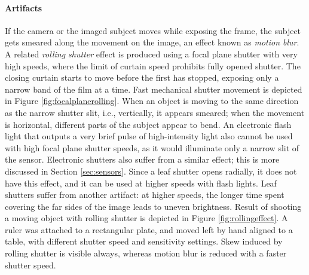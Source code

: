 \paragraph{Artifacts}
If the camera or the imaged subject moves while exposing the frame, the subject gets smeared along the movement on the image, an effect known as \emph{motion blur}.
A related \emph{rolling shutter} effect is produced using a focal plane shutter with very high speeds, where the limit of curtain speed prohibits fully opened shutter.
The closing curtain starts to move before the first has stopped, exposing only a narrow band of the film at a time.
Fast mechanical shutter movement is depicted in Figure \ref{fig:focalplanerolling}.
When an object is moving to the same direction as the narrow shutter slit, i.e., vertically, it appears smeared;
when the movement is horizontal, different parts of the subject appear to bend.
An electronic flash light that outputs a very brief pulse of high-intensity light also cannot be used with high focal plane shutter speeds, as it would illuminate only a narrow slit of the sensor.
Electronic shutters also suffer from a similar effect; this is more discussed in Section \ref{sec:sensors}.
Since a leaf shutter opens radially, it does not have this effect, and it can be used at higher speeds with flash lights.
Leaf shutters suffer from another artifact:
at higher speeds, the longer time spent covering the far sides of the image leads to uneven brightness.
Result of shooting a moving object with rolling shutter is depicted in Figure \ref{fig:rollingeffect}.
A ruler was attached to a rectangular plate, and moved left by hand aligned to a table, with different shutter speed and sensitivity settings.
Skew induced by rolling shutter is visible always, whereas motion blur is reduced with a faster shutter speed.



